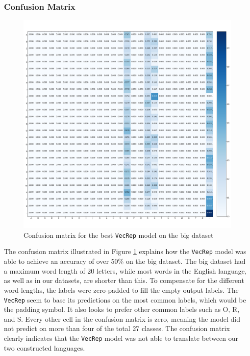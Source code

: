 \subsubsection{Confusion Matrix}
\begin{figure}[H]
    \centering
    \includegraphics[width=1\textwidth]{fig/results/experiment1/big/vecrep/confusion_matrix.png}
    \caption{Confusion matrix for the best {\tt VecRep} model on the big dataset}
    \label{fig:result1_big_vecrep_confusion_matrix}
\end{figure}

The confusion matrix illustrated in Figure \ref{fig:result1_big_vecrep_confusion_matrix} explains how the {\tt VecRep} model was able to achieve an accuracy of over 50\% on the big dataset. The big dataset had a maximum word length of 20 letters, while most words in the English language, as well as in our datasets, are shorter than this. To compensate for the different word-lengths, the labels were zero-padded to fill the empty output labels. The {\tt VecRep} seem to base its predictions on the most common labels, which would be the padding symbol. It also looks to prefer other common labels such as O, R, and S. Every other cell in the confusion matrix is zero, meaning the model did not predict on more than four of the total 27 classes. The confusion matrix clearly indicates that the {\tt VecRep} model was not able to translate between our two constructed languages. 

